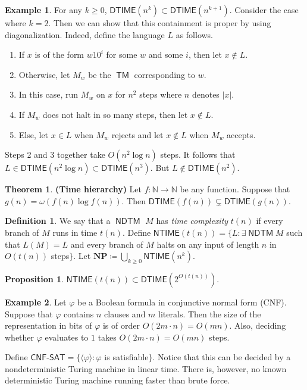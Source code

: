 \documentclass[10pt,letterpaper,cm]{nupset}
\theoremstyle{definition}
\newtheorem*{definition}{Definition}
\newtheorem{exmp}{Example}
\newtheorem{prop}{Proposition}
\newtheorem{theorem}{Theorem}
\newcommand{\N}{\mathbb N}
\newcommand{\1}{\mathbf{1}}
\newcommand{\0}{\vec 0}
\DeclareMathOperator{\TM}{\mathsf{TM}}
\DeclareMathOperator{\NDTM}{\mathsf{NDTM}}
\begin{document}
\begin{exmp}
For any $k\geq 0$, $\mathsf{DTIME}(n^k) \subset \mathsf{DTIME}(n^{k+1})$. Consider the case where $k=2$. Then we can show that this containment  is proper by using diagonalization. Indeed, define the language $L$ as follows. 
\begin{enumerate}
\item If $x$ is of the form $w10^i$ for some $w$ and some $i$, then let $x\notin L$.
\item Otherwise, let $M_w$ be the $\TM$ corresponding to $w$. 
\item In this case, run $M_w$ on $x$ for $n^2$ steps where $n$ denotes $|x|$. 
\item  If $M_w$ does not halt in so many steps, then let $x\notin L$. 
\item Else, let $x\in L$ when $M_w$ rejects and let $x\notin L$ when $M_w$ accepts. 
\end{enumerate}
Steps 2 and 3 together take $O(n^2 \log{n})$ steps. It follows that $L \in \mathsf{DTIME}(n^2\log{n})\subset \mathsf{DTIME}(n^3)$. But $L \notin \mathsf{DTIME}(n^2)$.
\end{exmp}

\begin{theorem}{\textbf{(Time hierarchy)}}
Let $f: \N \to \N$ be any function. Suppose that $g(n) = \omega(f(n) \log{f(n)})$. Then $\mathsf{DTIME}(f(n)) \subsetneq \mathsf{DTIME}(g(n))$.
\end{theorem}

\begin{definition}
We say that a $\NDTM$ $M$ has \textit{time complexity} $t(n)$ if every branch of $M$ runs in time $t(n)$. Define  $\mathsf{NTIME}(t(n)) = \{ L : \exists \NDTM M$ such that $L(M) = L$ and every branch of $M$ halts on any input of length $n$ in $O(t(n))$ steps$\}$. Let $\mathbf{NP} \coloneqq \bigcup_{k \geq 0} \mathsf{NTIME}(n^k)$.
\end{definition}

\begin{prop}
$\mathsf{NTIME}(t(n)) \subset \mathsf{DTIME}(2^{O(t(n))})$.
\end{prop}

\begin{exmp}
Let $\varphi$ be a Boolean formula in conjunctive normal form (CNF). Suppose that $\varphi$ contains $n$ clauses and $m$ literals. Then the size of the representation in bits of $\varphi$ is of order $O(2 m \cdot n) = O(mn)$. Also, deciding whether $\varphi$ evaluates to $1$ takes  $O(2 m \cdot n) = O(mn)$ steps. 

Define $\mathsf{CNF\text{-}SAT} = \{\langle \varphi \rangle : \varphi$ is satisfiable$\}$. Notice that this can be decided by a nondeterministic Turing machine in linear time.  There is, however, no known deterministic Turing machine running faster than brute force. 
\end{exmp}
\end{document}
